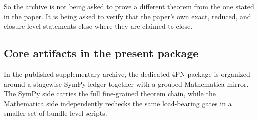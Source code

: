 \documentclass[11pt]{article}
\begin{document}
So the archive is not being asked to prove a different theorem from the one
stated in the paper.  It is being asked to verify that the paper's own exact,
reduced, and closure-level statements close where they are claimed to close.

\subsection{Core artifacts in the present package}
\label{sec:verification-artifacts}

In the published supplementary archive, the dedicated $4$PN package is organized
around a stagewise SymPy ledger together with a grouped Mathematica mirror.  The
SymPy side carries the full fine-grained theorem chain, while the Mathematica
side independently rechecks the same load-bearing gates in a smaller set of
bundle-level scripts.
\end{document}
